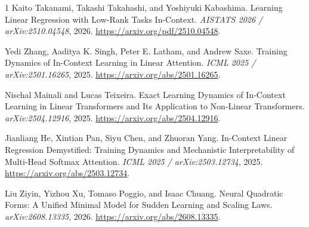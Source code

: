 \documentclass[11pt,a4paper]{article}
\theoremstyle{definition}
\begin{document}
\begin{thebibliography}{1}
Kaito Takanami, Takashi Takahashi, and Yoshiyuki Kabashima.
\newblock Learning Linear Regression with Low-Rank Tasks In-Context.
\newblock \emph{AISTATS 2026 / arXiv:2510.04548}, 2026.
\newblock \url{https://arxiv.org/pdf/2510.04548}.

Yedi Zhang, Aaditya K. Singh, Peter E. Latham, and Andrew Saxe.
\newblock Training Dynamics of In-Context Learning in Linear Attention.
\newblock \emph{ICML 2025 / arXiv:2501.16265}, 2025.
\newblock \url{https://arxiv.org/abs/2501.16265}.

Nischal Mainali and Lucas Teixeira.
\newblock Exact Learning Dynamics of In-Context Learning in Linear Transformers
and Its Application to Non-Linear Transformers.
\newblock \emph{arXiv:2504.12916}, 2025.
\newblock \url{https://arxiv.org/abs/2504.12916}.

Jianliang He, Xintian Pan, Siyu Chen, and Zhuoran Yang.
\newblock In-Context Linear Regression Demystified: Training Dynamics and
Mechanistic Interpretability of Multi-Head Softmax Attention.
\newblock \emph{ICML 2025 / arXiv:2503.12734}, 2025.
\newblock \url{https://arxiv.org/abs/2503.12734}.

Liu Ziyin, Yizhou Xu, Tomaso Poggio, and Isaac Chuang.
\newblock Neural Quadratic Forms: A Unified Minimal Model for Sudden Learning
and Scaling Laws.
\newblock \emph{arXiv:2608.13335}, 2026.
\newblock \url{https://arxiv.org/abs/2608.13335}.
\end{thebibliography}
\end{document}

